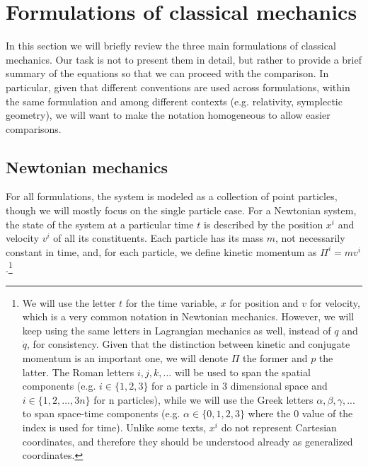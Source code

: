\section{Formulations of classical mechanics}

In this section we will briefly review the three main formulations of classical mechanics. Our task is not to present them in detail, but rather to provide a brief summary of the equations so that we can proceed with the comparison. In particular, given that different conventions are used across formulations, within the same formulation and among different contexts (e.g. relativity, symplectic geometry), we will want to make the notation homogeneous to allow easier comparisons.

\subsection{Newtonian mechanics}

For all formulations, the system is modeled as a collection of point particles, though we will mostly focus on the single particle case. For a Newtonian system, the state of the system at a particular time $t$ is described by the position $x^i$ and velocity $v^i$ of all its constituents. Each particle has its mass $m$, not necessarily constant in time, and, for each particle, we define kinetic momentum as $\Pi^i = m v^i$.\footnote{We will use the letter $t$ for the time variable, $x$ for position and $v$ for velocity, which is a very common notation in Newtonian mechanics. However, we will keep using the same letters in Lagrangian mechanics as well, instead of $q$ and $\dot{q}$, for consistency. Given that the distinction between kinetic and conjugate momentum is an important one, we will denote $\Pi$ the former and $p$ the latter. The Roman letters $i,j,k,...$ will be used to span the spatial components (e.g. $i \in \{1,2,3\}$ for a particle in 3 dimensional space and $i \in \{1,2,\dots, 3n\}$ for n particles), while we will use the Greek letters $\alpha, \beta, \gamma, ...$ to span space-time components (e.g. $\alpha \in \{0,1,2,3\}$ where the $0$ value of the index is used for time). Unlike some texts, $x^i$ do not represent Cartesian coordinates, and therefore they should be understood already as generalized coordinates.}

